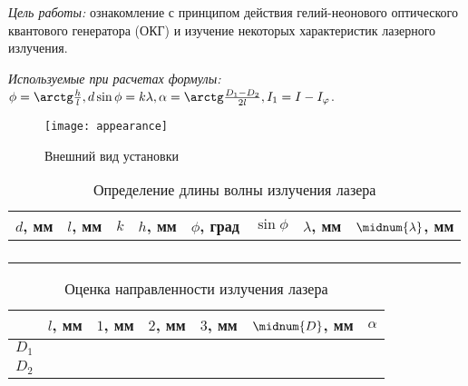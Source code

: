 \documentclass[10pt,pscyr,nonums]{hedlab}
\begin{document}
    \makeheader

    \emph{Цель работы:} ознакомление с принципом действия гелий-неонового
    оптического квантового генератора (ОКГ) и изучение некоторых характеристик
    лазерного излучения.
    
    \emph{Используемые при расчетах формулы:}
    \( \phi = \arctg\frac{h}{l}, d\sin\phi = k\lambda,
        \alpha = \arctg\frac{D_1 - D_2}{2l}, I_1 = I - I_\varphi \).

    \begin{figure}[h!]
        \center
        \texttt{[image: appearance]}\\
        \parbox{.4\textwidth}{\caption{Внешний вид установки}}
    \end{figure}
    \vspace*{-2em}
    
    \begin{table}[h!]
        \center \caption{Определение длины волны излучения лазера}
        \begin{tabular}{|*{8}{C{.08}|}} \hline
            \( d \), мм & \( l \), мм & \( k \) & \( h \), мм &
                \( \phi \), град & \( \sin\phi \) & \( \lambda \), мм &
                \( \midnum{\lambda} \), мм \\ \hline
             &  &&&&&&
                 \\ 
            &&&&&&& \\ \hline
             &  &&&&&&
                 \\ 
            &&&&&&& \\ \hline
        \end{tabular}
    \end{table}
    
    \begin{table}[h!]
        \center \caption{Оценка направленности излучения лазера}
        \begin{tabular}{|*{7}{C{.08}|}} \hline
            & \( l \), мм & \( 1 \), мм & \( 2 \), мм & \( 3 \), мм &
                \( \midnum{D} \), мм & \( \alpha \) \\ \hline
            \( D_1 \) &  &&&&&
                 \\ 
            \( D_2 \) &&&&&& \\ \hline
        \end{tabular}
    \end{table}
    
\end{document}

